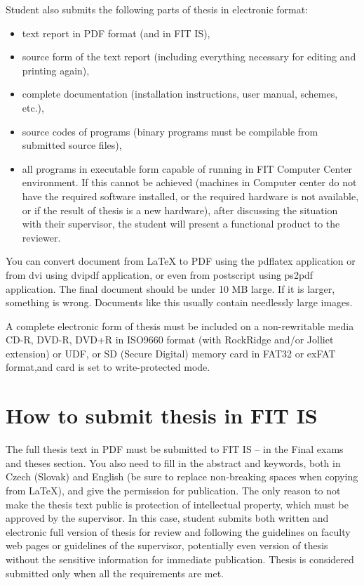 Student also submits the following parts of thesis in electronic format:
\begin{itemize}
  \item{text report in PDF format (and in FIT IS),}
  \item{source form of the text report (including everything necessary for editing and printing again),}
  \item{complete documentation (installation instructions, user manual, schemes, etc.),}
  \item{source codes of programs (binary programs must be compilable from submitted source files),}
  \item{all programs in executable form capable of running in FIT Computer Center environment. If this cannot be achieved (machines in Computer center do not have the required software installed, or the required hardware is not available, or if the result of thesis is a new hardware), after discussing the situation with their supervisor, the student will present a functional product to the reviewer.}
\end{itemize}

You can convert document from LaTeX to PDF using the pdflatex application or from dvi using dvipdf application, or even from postscript using ps2pdf application. The final document should be under 10 MB large. If it is larger, something is wrong. Documents like this usually contain needlessly large images.

A complete electronic form of thesis must be included on a non-rewritable media CD-R, DVD-R, DVD+R in ISO9660 format (with RockRidge and/or Jolliet extension) or UDF, or SD (Secure Digital) memory card in FAT32 or exFAT format,and card is set to write-protected mode.


\section{How to submit thesis in FIT IS}
The full thesis text in PDF must be submitted to FIT IS -- in the Final exams and theses section. You also need to fill in the abstract and keywords, both in Czech (Slovak) and English (be sure to replace non-breaking spaces when copying from \LaTeX{}), and give the permission for publication. The only reason to not make the thesis text public is protection of intellectual property, which must be approved by the supervisor. In this case, student submits both written and electronic full version of thesis for review and following the guidelines on faculty web pages or guidelines of the supervisor, potentially even version of thesis without the sensitive information for immediate publication. Thesis is considered submitted only when all the requirements are met.

